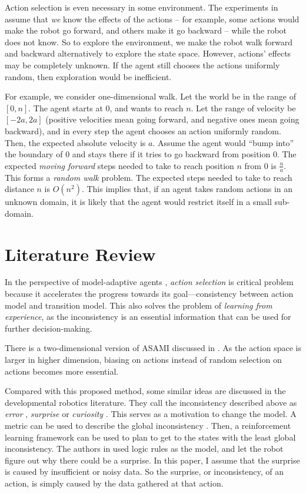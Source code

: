 \documentclass[10pt]{article}
\begin{document}
Action selection is even necessary in some environment. The
experiments in \cite{CSJ06} assume that \textit{we} know the effects of
the actions -- for example, some actions would make the robot go
forward, and others make it go backward -- while the robot does not
know.
So to explore the environment, we make the robot walk forward and
backward alternatively to explore the state space. However, 
actions' effects may be completely unknown.  If the agent still chooses the
actions uniformly random, then exploration would be inefficient.

For example, we consider one-dimensional walk. Let the world be in the
range of $[0,n]$. The agent starts at 0, and wants to reach $n$. Let
the range of velocity be $[-2a, 2a]$ (positive velocities mean going
forward, and negative ones mean going backward), and in every step the
agent chooses an action uniformly random.  Then, the expected absolute
velocity is $a$. Assume the agent would ``bump into'' the boundary of
$0$ and stays there if it tries to go backward from position $0$. The
expected \textit{moving forward} steps needed to take to reach
position $n$ from $0$ is $\frac{n}{a}$. This forms a \textit{random walk}
\cite{motwani1995randomized} problem. The expected steps needed to
take to reach distance $n$ is $O(n^2)$. This implies that, if an
agent takes random actions in an unknown domain, it is likely that the
agent would restrict itself in a small sub-domain.

\section{Literature Review}

In the perspective of model-adaptive agents \cite{maes1993modeling},
\textit{action selection} is critical problem because it
accelerates the progress towards its goal---consistency between action
model and transition model. This also solves the problem of
\textit{learning from experience}, as the inconsistency is an
essential information that can be used for further decision-making.

There is a two-dimensional version of ASAMI discussed in
\cite{ICRA08-stronger}.  As the action space is larger in higher
dimension, biasing on actions instead of random selection on actions
becomes more essential.

Compared with this proposed method, some similar ideas are discussed
in the developmental robotics literature. They call the inconsistency
described above as \textit{error} \cite{oudeyer2006discovering},
\textit{surprise} \cite{ranasinghe2008surprise} or \textit{curiosity}
\cite{schmidhuber2006developmental}. This serves as a motivation to
change the model. A metric can be used to describe the global
inconsistency \cite{oudeyer2006discovering}. Then, a reinforcement
learning framework can be used to plan to get to the states with the
least global inconsistency. The authors in
\cite{ranasinghe2008surprise} used logic rules as the model, and let
the robot figure out why there could be a surprise. In this paper, I
assume that the surprise is caused by insufficient or noisy data. So
the surprise, or inconsistency, of an action, is simply caused by the
data gathered at that action.
\end{document}
